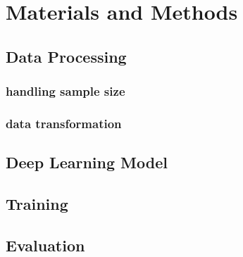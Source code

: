 

\section{Materials and Methods}
\label{section2}

\subsection{Data Processing}

\subsubsection{handling sample size}


\subsubsection{data transformation}



\subsection{Deep Learning Model}


\subsection{Training}


\subsection{Evaluation}